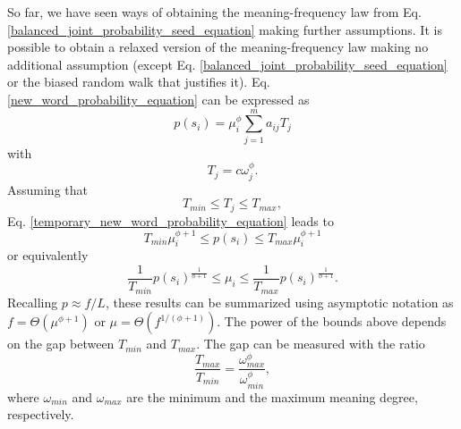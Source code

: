 \documentclass{article}
\begin{document}
So far, we have seen ways of obtaining the meaning-frequency law from Eq. \ref{balanced_joint_probability_seed_equation} making further assumptions. It is possible to obtain a relaxed version of the meaning-frequency law making no additional assumption (except Eq. \ref{balanced_joint_probability_seed_equation} or the biased random walk that justifies it). 
Eq. \ref{new_word_probability_equation} can be expressed as 
\begin{equation}
p(s_i) = \mu_i^\phi \sum_{j=1}^m a_{ij} T_j 
\label{temporary_new_word_probability_equation}
\end{equation}
with 
\begin{equation*}
T_j = c \omega_j^\phi.
\end{equation*}
Assuming that 
\begin{equation*}
T_{min} \leq T_j \leq T_{max},
\end{equation*}
Eq. \ref{temporary_new_word_probability_equation} leads to 
\begin{equation}
T_{min} \mu_i^{\phi + 1} \leq p(s_i) \leq T_{max} \mu_i^{\phi+1}  
\label{relaxed_mirror_meaning_frequency_law_equation}
\end{equation} 
or equivalently
\begin{equation*}
\frac{1}{T_{min}} p(s_i)^{\frac{1}{\phi + 1}} \leq \mu_i \leq \frac{1}{T_{max}} p(s_i)^{\frac{1}{\phi + 1}}.
\end{equation*} 
Recalling $p \approx f/L$, these results can be summarized using asymptotic notation as $f = \Theta(\mu^{\phi+1})$ or $\mu = \Theta(f^{1/(\phi + 1)})$.
The power of the bounds above depends on the gap between $T_{min}$ and $T_{max}$. The gap can be measured with the ratio 
\begin{equation*}
\frac{T_{max}}{T_{min}} = \frac{\omega_{max}^\phi}{\omega_{min}^\phi}, 
\end{equation*}
where $\omega_{min}$ and $\omega_{max}$ are the minimum and the maximum meaning degree, respectively.
\end{document}
